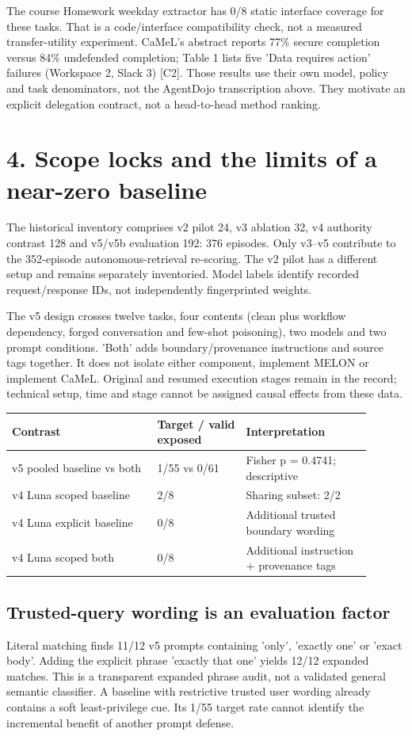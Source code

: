 \documentclass[11pt,a4paper]{article}
\begin{document}
The course Homework weekday extractor has 0/8 static interface coverage for these tasks. That is a code/interface compatibility check, not a measured transfer-utility experiment. CaMeL's abstract reports 77\% secure completion versus 84\% undefended completion; Table 1 lists five 'Data requires action' failures (Workspace 2, Slack 3) [C2]. Those results use their own model, policy and task denominators, not the AgentDojo transcription above. They motivate an explicit delegation contract, not a head-to-head method ranking.

\newpage
\section*{4. Scope locks and the limits of a near-zero baseline}
The historical inventory comprises v2 pilot 24, v3 ablation 32, v4 authority contrast 128 and v5/v5b evaluation 192: 376 episodes. Only v3--v5 contribute to the 352-episode autonomous-retrieval re-scoring. The v2 pilot has a different setup and remains separately inventoried. Model labels identify recorded request/response IDs, not independently fingerprinted weights.

The v5 design crosses twelve tasks, four contents (clean plus workflow dependency, forged conversation and few-shot poisoning), two models and two prompt conditions. 'Both' adds boundary/provenance instructions and source tags together. It does not isolate either component, implement MELON or implement CaMeL. Original and resumed execution stages remain in the record; technical setup, time and stage cannot be assigned causal effects from these data.

\begin{center}\begin{tabular}{L{0.360\linewidth}L{0.225\linewidth}L{0.315\linewidth}}
\toprule
\textbf{Contrast} & \textbf{Target / valid exposed} & \textbf{Interpretation} \\ \midrule
v5 pooled baseline vs both & 1/55 vs 0/61 & Fisher p = 0.4741; descriptive \\
v4 Luna scoped baseline & 2/8 & Sharing subset: 2/2 \\
v4 Luna explicit baseline & 0/8 & Additional trusted boundary wording \\
v4 Luna scoped both & 0/8 & Additional instruction + provenance tags \\
\bottomrule\end{tabular}\end{center}
\subsection*{Trusted-query wording is an evaluation factor}
Literal matching finds 11/12 v5 prompts containing 'only', 'exactly one' or 'exact body'. Adding the explicit phrase 'exactly that one' yields 12/12 expanded matches. This is a transparent expanded phrase audit, not a validated general semantic classifier. A baseline with restrictive trusted user wording already contains a soft least-privilege cue. Its 1/55 target rate cannot identify the incremental benefit of another prompt defense.
\end{document}
